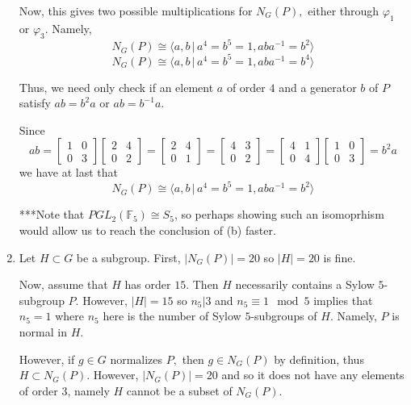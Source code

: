 \documentclass[12pt]{Qual}
\begin{document}
\begin{solution}
\begin{enumerate}[label=(\alph*)]
    Now, this gives two possible multiplications for $N_G(P),$ either through $\varphi_1$ or $\varphi_3$. Namely, $$N_G(P)\cong\langle a,b\,|\,a^4=b^5=1,aba^{-1}=b^2\rangle$$ $$N_G(P)\cong\langle a,b\,|\,a^4=b^5=1,aba^{-1}=b^4\rangle$$

    Thus, we need only check if an element $a$ of order $4$ and a generator $b$ of $P$ satisfy $ab=b^2a$ or $ab=b^{-1}a$.

    Since $$ab=\begin{bmatrix}
    1 & 0\\
    0 & 3
    \end{bmatrix}\begin{bmatrix}
    2 & 4\\
    0 & 2
    \end{bmatrix}=\begin{bmatrix}
    2 & 4\\
    0 & 1
    \end{bmatrix}=\begin{bmatrix}
    4 & 3\\
    0 & 2
    \end{bmatrix}=\begin{bmatrix}
    4 & 1\\
    0 & 4
    \end{bmatrix}\begin{bmatrix}
    1 & 0\\
    0 & 3
    \end{bmatrix}=b^2a$$ we have at last that $$N_G(P)\cong\langle a,b\,|\,a^4=b^5=1,aba^{-1}=b^2\rangle$$

    \begin{mybox}
    ***Note that $PGL_2(\mathbb{F}_5)\cong S_5$, so perhaps showing such an isomoprhism would allow us to reach the conclusion of (b) faster.
\end{mybox}

    \item

     Let $H\subset G$ be a subgroup. First, $|N_G(P)|=20$ so $|H|=20$ is fine.

     Now, assume that $H$ has order $15.$ Then $H$ necessarily contains a Sylow $5$-subgroup $P.$ However, $|H|=15$ so $n_5|3$ and $n_5\equiv 1\mod 5$ implies that $n_5=1$ where $n_5$ here is the number of Sylow $5$-subgroups of $H.$ Namely, $P$ is normal in $H.$

    However, if $g\in G$ normalizes $P,$ then $g\in N_G(P)$ by definition, thus $H\subset N_G(P).$ However, $|N_G(P)|=20$ and so it does not have any elements of order $3$, namely $H$ cannot be a subset of $N_G(P).$


\end{enumerate}
\end{solution}
\end{document}
